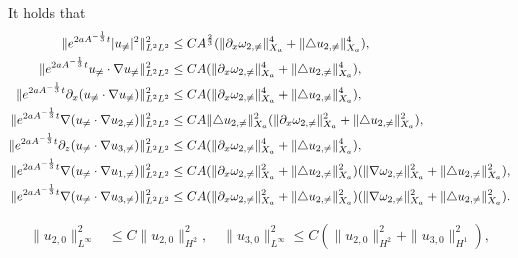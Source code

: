 \documentclass[10pt,a4paper]{amsart}
\begin{document}
	\begin{lemma}\label{lemma_neq1}
		It holds that 
		\begin{equation}\label{eq:nonlinear-neq0}
			\begin{aligned}
				\|{\rm e}^{2aA^{-\frac{1}{3}}t}|u_{\neq}|^2\|_{L^2L^2}^2&\leq
				CA^{\frac{2}{3}}(\|\partial_x\omega_{2,\neq}\|^4_{X_a}+\|\triangle u_{2,\neq}\|^4_{X_a}),\\
				\|{\rm e}^{2aA^{-\frac{1}{3}}t}u_{\neq}\cdot\nabla u_{\neq}\|_{L^2L^2}^2&\leq
				CA(\|\partial_x\omega_{2,\neq}\|^4_{X_a}+\|\triangle u_{2,\neq}\|^4_{X_a}),\\
				\|{\rm e}^{2aA^{-\frac{1}{3}}t}\partial_x(u_{\neq}\cdot\nabla u_{\neq})\|^2_{L^2L^2}
				&\leq CA(\|\partial_x\omega_{2,\neq}\|^4_{X_a}
				+\|\triangle u_{2,\neq}\|^4_{X_a}),\\		
				\|{\rm e}^{2aA^{-\frac{1}{3}}t}\nabla(u_{\neq}\cdot\nabla u_{2,\neq})\|^2_{L^2L^2}
				&\leq CA\|\triangle u_{2,\neq}\|^2_{X_a}(\|\partial_x\omega_{2,\neq}\|^2_{X_a}
				+\|\triangle u_{2,\neq}\|^2_{X_a}),\\	
				\|{\rm e}^{2aA^{-\frac{1}{3}}t}\partial_z(u_{\neq}\cdot\nabla u_{3,\neq})\|_{L^2L^2}^2	
				&\leq CA(\|\partial_x\omega_{2,\neq}\|^4_{X_a}
				+\|\triangle u_{2,\neq}\|^4_{X_a}), \\		
				\|{\rm e}^{2aA^{-\frac{1}{3}}t}\nabla(u_{\neq}\cdot\nabla u_{1,\neq})\|^2_{L^2L^2}
				&\leq  CA(\|\partial_x\omega_{2,\neq}\|^2_{X_a}
				+\|\triangle u_{2,\neq}\|^2_{X_a})
				(\|\nabla\omega_{2,\neq}\|^2_{X_a}
				+\|\triangle u_{2,\neq}\|^2_{X_a}),\\
				\|{\rm e}^{2aA^{-\frac{1}{3}}t}\nabla(u_{\neq}\cdot\nabla u_{3,\neq})\|^2_{L^2L^2}
				&\leq  CA(\|\partial_x\omega_{2,\neq}\|^2_{X_a}
				+\|\triangle u_{2,\neq}\|^2_{X_a})
				(\|\nabla\omega_{2,\neq}\|^2_{X_a}
				+\|\triangle u_{2,\neq}\|^2_{X_a}).
			\end{aligned}
		\end{equation}
	\end{lemma}

		\begin{equation}\label{u23_infty}
			\begin{aligned}
				\|u_{2,0}\|^2_{L^{\infty}}&\leq C\|u_{2,0}\|^2_{H^2},\quad
				\|u_{3,0}\|^2_{L^{\infty}}\leq C(\|u_{2,0}\|^2_{H^2}+\|u_{3,0}\|^2_{H^1}),
			\end{aligned}
		\end{equation}
\end{document}
